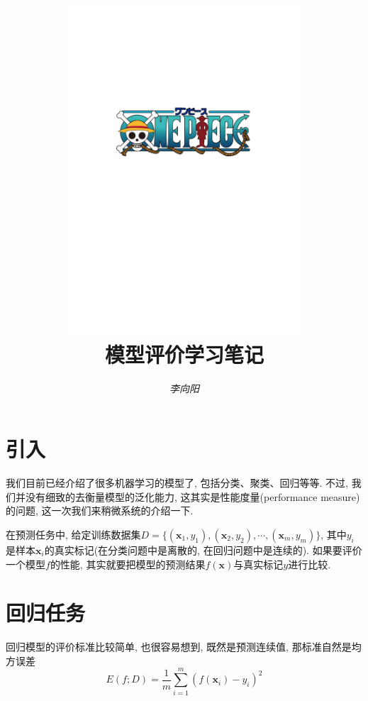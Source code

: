 \documentclass[a4paper,UTF8]{ctexart}
\theoremstyle{plain} \newtheorem{theorem}{定理}[section]
\theoremstyle{plain} \newtheorem{definition}{定义}[section]
\theoremstyle{plain} \newtheorem{lemma}{引理}[section]
\theoremstyle{plain} \newtheorem{proposition}{命题}[section]
\theoremstyle{plain} \newtheorem{example}{例}[section]
\theoremstyle{plain} \newtheorem{remark}{注}[section]
\theoremstyle{plain} \newtheorem{corollary}{推论}[section]
\begin{document}
\title{
\includegraphics[width=0.65\textwidth]{onepiece.pdf}\\
\vspace{2em}
\textbf{模型评价学习笔记}}
\author{\emph{李向阳}  }
\date{}


\maketitle
\thispagestyle{empty}

\newpage


\tableofcontents

\newpage

\section{引入}
我们目前已经介绍了很多机器学习的模型了, 包括分类、聚类、回归等等. 不过, 我们并没有细致的去衡量模型的泛化能力, 这其实是性能度量(performance measure)的问题, 这一次我们来稍微系统的介绍一下.

在预测任务中, 给定训练数据集$D = \{ (\bm{x}_1, y_1), (\bm{x}_2, y_2), \cdots, (\bm{x}_m, y_m) \}$, 其中$y_i$是样本$\bm{x}_i$的真实标记(在分类问题中是离散的, 在回归问题中是连续的). 如果要评价一个模型$f$的性能, 其实就要把模型的预测结果$f(\bm{x})$与真实标记$y$进行比较.


\section{回归任务}
回归模型的评价标准比较简单, 也很容易想到, 既然是预测连续值, 那标准自然是均方误差
\begin{equation}
E(f; D) = \frac{1}{m} \sum_{i=1}^{m} (f(\bm{x}_i) - y_i)^2
\end{equation}
\end{document}
